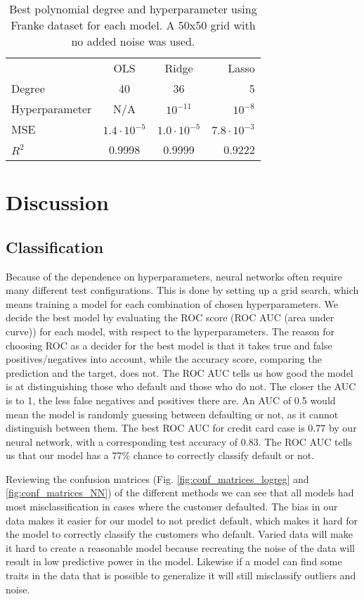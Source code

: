 \documentclass[%
 reprint,
nofootinbib,
 amsmath,amssymb,
 aps,
]{revtex4-2}
\begin{document}
\begin{table}[b]
\caption{\label{tab:best_p_franke}%
Best polynomial degree and hyperparameter using Franke dataset for each model. A 50x50 grid with no added noise was used.
}
\begin{ruledtabular}
\begin{tabular}{lccr}
\textrm{}&
\multicolumn{1}{c}{\textrm{OLS}}&
\multicolumn{1}{c}{\textrm{Ridge}}&
\textrm{Lasso}\\
\colrule
Degree & 40 & 36 & 5 \\
Hyperparameter & N/A & $10^{-11}$ & $10^{-8}$ \\
MSE & $1.4 \cdot 10^{-5}$ & $1.0 \cdot 10^{-5}$ & $7.8 \cdot 10^{-3}$  \\
$R^2$ & 0.9998 & 0.9999 & 0.9222 \\
\end{tabular}
\end{ruledtabular}
\end{table}


\section{Discussion}\label{sec:discussion}

\subsection{Classification}
Because of the dependence on hyperparameters, neural networks often require many different test configurations. This is done by setting up a grid search, which means training a model for each combination of chosen hyperparameters. We decide the best model by evaluating the ROC score (ROC AUC (area under curve)) for each model, with respect to the hyperparameters. The reason for choosing ROC as a decider for the best model is that it takes true and false positives/negatives into account, while the accuracy score, comparing the prediction and the target, does not. The ROC AUC tells us how good the model is at distinguishing those who default and those who do not. The closer the AUC is to 1, the less false negatives and positives there are. An AUC of 0.5 would mean the model is randomly guessing between defaulting or not, as it cannot distinguish between them. The best ROC AUC for credit card case is $0.77$ by our neural network, with a corresponding test accuracy of $0.83$. The ROC AUC tells us that our model has a $77\%$ chance to correctly classify default or not.

Reviewing the confusion matrices (Fig. \ref{fig:conf_matrices_logreg} and \ref{fig:conf_matrices_NN}) of the different methods we can see that all models had most misclassification in cases where the customer defaulted. The bias in our data makes it easier for our model to not predict default, which makes it hard for the model to correctly classify the customers who default. Varied data will make it hard to create a reasonable model because recreating the noise of the data will result in low predictive power in the model. Likewise if a model can find some traits in the data that is possible to generalize it will still misclassify outliers and noise.
\end{document}
